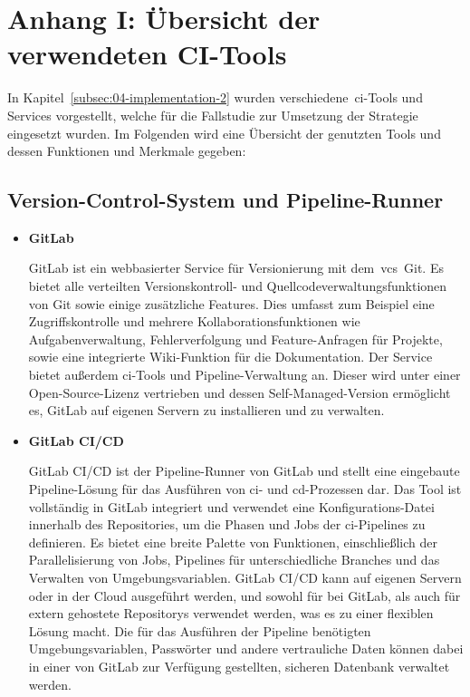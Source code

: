 
\section{Anhang I: Übersicht der verwendeten CI-Tools} \label{sec:appendix-1}

In Kapitel\ \ref{subsec:04-implementation-2} wurden verschiedene\ \acrshort{ci}-Tools und Services vorgestellt, welche
für die Fallstudie zur Umsetzung der Strategie eingesetzt wurden.
Im Folgenden wird eine Übersicht der genutzten Tools und dessen Funktionen und Merkmale gegeben:

\subsection*{Version-Control-System und Pipeline-Runner}

\begin{itemize}
    \item {
        \textbf{GitLab}\par
        GitLab ist ein webbasierter Service für Versionierung mit dem\ \acrshort{vcs}\ \glqq Git\grqq.
        Es bietet alle verteilten Versionskontroll- und Quellcodeverwaltungsfunktionen von Git sowie einige zusätzliche
        Features.
        Dies umfasst zum Beispiel eine Zugriffskontrolle und mehrere Kollaborationsfunktionen wie Aufgabenverwaltung,
        Fehlerverfolgung und Feature-Anfragen für Projekte, sowie eine integrierte Wiki-Funktion für die
        Dokumentation.
        Der Service bietet außerdem \acrshort{ci}-Tools und Pipeline-Verwaltung an.
        Dieser wird unter einer Open-Source-Lizenz vertrieben und dessen Self-Managed-Version ermöglicht es,
        GitLab auf eigenen Servern zu installieren und zu verwalten.
    }

    \item {
        \textbf{GitLab CI/CD}\par
        GitLab CI/CD ist der Pipeline-Runner von GitLab und stellt eine eingebaute Pipeline-Lösung für das Ausführen von
        \acrshort{ci}- und \acrshort{cd}-Prozessen dar.
        Das Tool ist vollständig in GitLab integriert und verwendet eine Konfigurations-Datei innerhalb des
        Repositories, um die Phasen und Jobs der \acrshort{ci}-Pipelines zu definieren.
        Es bietet eine breite Palette von Funktionen, einschließlich der Parallelisierung von Jobs, Pipelines für
        unterschiedliche Branches und das Verwalten von Umgebungsvariablen.
        GitLab CI/CD kann auf eigenen Servern oder in der Cloud ausgeführt werden, und sowohl für bei GitLab, als auch
        für extern gehostete Repositorys verwendet werden, was es zu einer flexiblen Lösung macht.
        Die für das Ausführen der Pipeline benötigten Umgebungsvariablen, Passwörter und andere vertrauliche Daten
        können dabei in einer von GitLab zur Verfügung gestellten, sicheren Datenbank verwaltet werden.
    }
\end{itemize}

